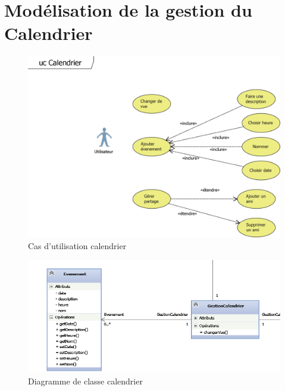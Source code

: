 \documentclass[11pt]{article}
\begin{document}
\section{Modélisation de la gestion du Calendrier}
\begin{figure}[!h]
        \centering \includegraphics[scale=1]{ucCal.png}
        \caption{Cas d'utilisation calendrier}
         \label{fig:ucCal}
\end{figure}
\begin{figure}[!h]
        \centering \includegraphics[scale=1]{calendrier.png}
        \caption{Diagramme de classe calendrier}
         \label{fig:cal}
\end{figure}

\newpage
\end{document}
